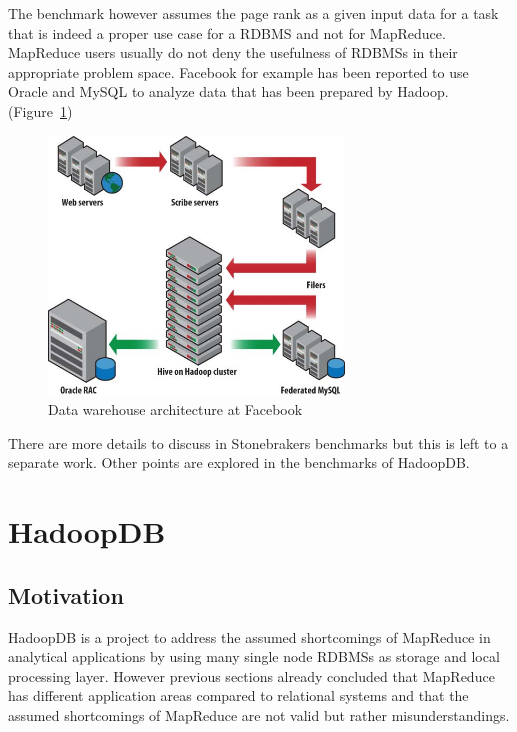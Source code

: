 \documentclass[12pt,a4paper]{scrartcl}		%
\begin{document}
The benchmark however assumes the page rank as a given input data for a task that is indeed a proper use case for a RDBMS and not for MapReduce. MapReduce users usually do not deny the usefulness of RDBMSs in their appropriate problem space. Facebook for example has been reported to use Oracle and MySQL to analyze data that has been prepared by Hadoop. (Figure~\ref{fig:facebookdatawarehouse})

\begin{figure}[t]
  \centering
  \includegraphics[width=0.7\textwidth]{images/rdms_as_frontend.jpg}
  \caption{Data warehouse architecture at Facebook\cite[p. 508]{White201010}}
  \label{fig:facebookdatawarehouse}
\end{figure}

There are more details to discuss in Stonebrakers benchmarks but this is left to a separate work. Other points are explored in the benchmarks of HadoopDB.

\section{HadoopDB}

\subsection{Motivation}

HadoopDB is a project to address the assumed shortcomings of MapReduce in analytical applications by using many single node RDBMSs as storage and local processing layer. However previous sections already concluded that MapReduce has different application areas compared to relational systems and that the assumed shortcomings of MapReduce are not valid but rather misunderstandings.
\end{document}
